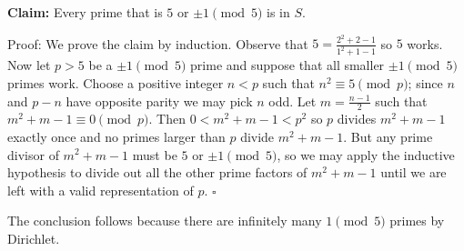 \textbf{Claim:} Every prime that is $5$ or $\pm1\pmod5$ is in $S$.

Proof: We prove the claim by induction. Observe that $5=\frac{2^2+2-1}{1^2+1-1}$ so $5$ works. Now let $p>5$ be a $\pm1\pmod5$ prime and suppose that all smaller $\pm1\pmod5$ primes work. Choose a positive integer $n<p$ such that $n^2\equiv5\pmod p$; since $n$ and $p-n$ have opposite parity we may pick $n$ odd. Let $m=\frac{n-1}{2}$ such that $m^2+m-1\equiv0\pmod p$. Then $0<m^2+m-1<p^2$ so $p$ divides $m^2+m-1$ exactly once and no primes larger than $p$ divide $m^2+m-1$. But any prime divisor of $m^2+m-1$ must be $5$ or $\pm1\pmod5$, so we may apply the inductive hypothesis to divide out all the other prime factors of $m^2+m-1$ until we are left with a valid representation of $p$. $\square$

The conclusion follows because there are infinitely many $1\pmod5$ primes by Dirichlet.